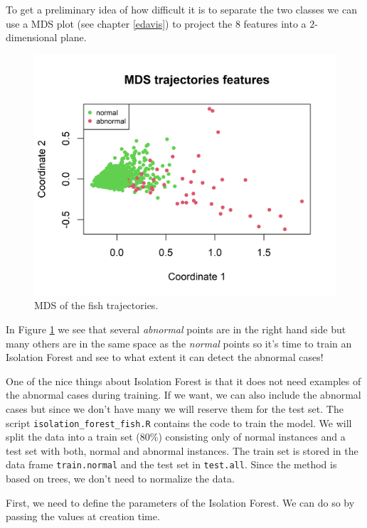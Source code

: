 \documentclass[
  11pt,
]{krantz}
\newenvironment{Shaded}{\begin{snugshade}}{\end{snugshade}}
\newcommand{\AttributeTok}[1]{\textcolor[rgb]{0.61,0.61,0.61}{#1}}
\newcommand{\DecValTok}[1]{\textcolor[rgb]{0.06,0.06,0.06}{#1}}
\newcommand{\FunctionTok}[1]{\textcolor[rgb]{0,0,0}{#1}}
\newcommand{\NormalTok}[1]{#1}
\newcommand{\OtherTok}[1]{\textcolor[rgb]{0.37,0.37,0.37}{#1}}
\newcommand{\SpecialCharTok}[1]{\textcolor[rgb]{0,0,0}{#1}}
\begin{document}
To get a preliminary idea of how difficult it is to separate the two classes we can use a MDS plot (see chapter \ref{edavis}) to project the \(8\) features into a \(2\)-dimensional plane.

\begin{figure}

{\centering \includegraphics[width=0.8\linewidth]{images/mdsFishes} 

}

\caption{MDS of the fish trajectories.}\label{fig:mdsFishes}
\end{figure}

In Figure \ref{fig:mdsFishes} we see that several \emph{abnormal} points are in the right hand side but many others are in the same space as the \emph{normal} points so it's time to train an Isolation Forest and see to what extent it can detect the abnormal cases!

One of the nice things about Isolation Forest is that it does not need examples of the abnormal cases during training. If we want, we can also include the abnormal cases but since we don't have many we will reserve them for the test set. The script \texttt{isolation\_forest\_fish.R} contains the code to train the model. We will split the data into a train set (\(80\%\)) consisting only of normal instances and a test set with both, normal and abnormal instances. The train set is stored in the data frame \texttt{train.normal} and the test set in \texttt{test.all}. Since the method is based on trees, we don't need to normalize the data.

First, we need to define the parameters of the Isolation Forest. We can do so by passing the values at creation time.

\begin{Shaded}
\end{Shaded}
\end{document}
